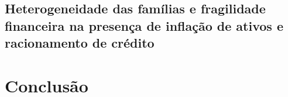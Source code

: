\documentclass[11pt]{article}
\begin{document}
\subsection{Heterogeneidade das famílias e fragilidade financeira na presença de inflação de ativos e racionamento de crédito}
\label{sec:org68d10e7}





\section{Conclusão}
\label{sec:org6340b89}
\end{document}
